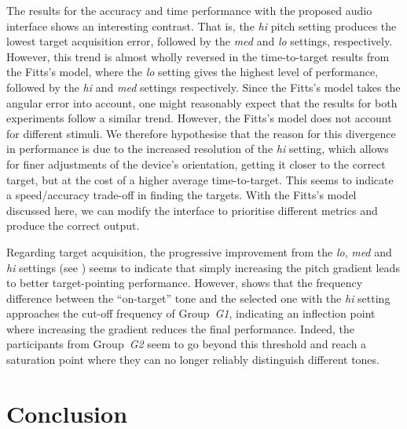 \documentclass[]{interact}
\begin{document}
The results for the accuracy and time performance with the proposed audio interface shows an interesting contrast.
That is, the \textit{hi} pitch setting produces the lowest target acquisition error, followed by the \textit{med} and \textit{lo} settings, respectively. 
However, this trend is almost wholly reversed in the time-to-target results from the Fitts's model, where the \textit{lo} setting gives the highest level of performance, followed by the \textit{hi} and \textit{med} settings respectively. 
Since the Fitts's model takes the angular error into account, one might reasonably expect that the results for both experiments follow a similar trend. 
However, the Fitts's model does not account for different stimuli.
We therefore hypothesise that the reason for this divergence in performance is due to the increased resolution of the \textit{hi} setting, which allows for finer adjustments of the device's orientation, getting it closer to the correct target, but at the cost of a higher average time-to-target. 
This seems to indicate a speed/accuracy trade-off in finding the targets.
With the Fitts's model discussed here, we can modify the interface to prioritise different metrics and produce the correct output. 

Regarding target acquisition, the progressive improvement from the \textit{lo}, \textit{med} and \textit{hi} settings (see ) seems to indicate that simply increasing the pitch gradient leads to better target-pointing performance.
However,  shows that the frequency difference between the ``on-target'' tone and the selected one with the \textit{hi} setting approaches the cut-off frequency of Group~\textit{G1}, indicating an inflection point where increasing the gradient reduces the final performance. 
Indeed, the participants from Group~\textit{G2} seem to go beyond this threshold and reach a saturation point where they can no longer reliably distinguish different tones.  

\section{Conclusion}\label{sec:conclusion}
\end{document}
